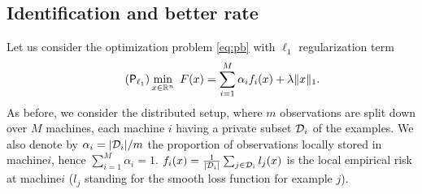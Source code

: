 \subsection{Identification and better rate}\label{sec:soda-identiification}
Let us consider the optimization problem \eqref{eq:pb} with $\ell_1$ regularization term
\begin{align}\label{eq:pb_l1}
\tag{$\mathsf{P}_{\ell_1}$}
\min_{x\in\mathbb{R}^n}  ~ F(x) =  \sum_{i=1}^M  \alpha_i  f_i(x)  +  \lambda\|x\|_1.
\end{align}
As before, we consider the distributed setup, where $m$ observations are split down over $M$ machines, each machine $i$ having a private subset $\mathcal{D}_i$ of the examples. We also denote by $\alpha_i= |\mathcal{D}_i|/m$ the proportion of observations locally stored in machine\;$i$, hence $\sum_{i=1}^M\alpha_i = 1$. $f_i(x) = \frac{1}{|\mathcal{D}_i|}  \sum_{j\in\mathcal{D}_i}l_j(x) $ is the local empirical risk at machine\;$i$ ($l_j$ standing for the smooth loss function for example $j$). %






